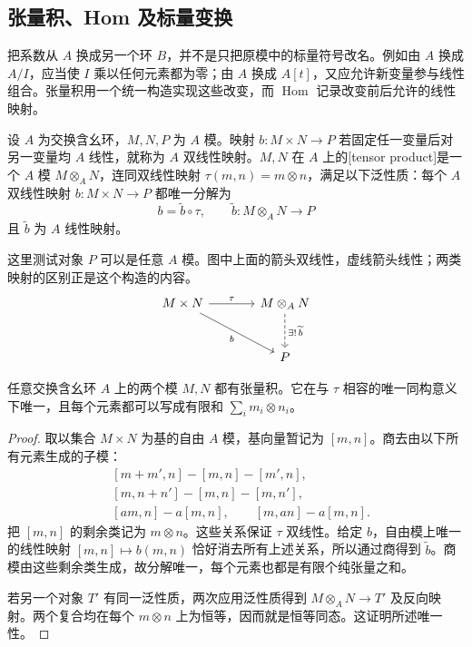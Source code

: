 \subsection{张量积、Hom 及标量变换}
\label{g5:subsec:0202:03}

把系数从 \(A\) 换成另一个环 \(B\)，并不是只把原模中的标量符号改名。例如由 \(A\) 换成 \(A/I\)，应当使 \(I\) 乘以任何元素都为零；由 \(A\) 换成 \(A[t]\)，又应允许新变量参与线性组合。张量积用一个统一构造实现这些改变，而 \(\operatorname{Hom}\) 记录改变前后允许的线性映射。

\begin{definition}\label{g5:def:tensor-product}
	设 \(A\) 为交换含幺环，\(M,N,P\) 为 \(A\) 模。映射 \(b:M\times N\rightarrow P\) 若固定任一变量后对另一变量均 \(A\) 线性，就称为 \(A\) 双线性映射。\(M,N\) 在 \(A\) 上的[tensor product]是一个 \(A\) 模 \(M\otimes_A N\)，连同双线性映射 \(\tau(m,n)=m\otimes n\)，满足以下泛性质：每个 \(A\) 双线性映射 \(b:M\times N\rightarrow P\) 都唯一分解为
	\[
		b=\widetilde b\circ\tau,\qquad
		\widetilde b:M\otimes_A N\longrightarrow P
	\]
	且 \(\widetilde b\) 为 \(A\) 线性映射。
\end{definition}

这里测试对象 \(P\) 可以是任意 \(A\) 模。图中上面的箭头双线性，虚线箭头线性；两类映射的区别正是这个构造的内容。
\[
	\begin{tikzcd}[column sep=large,row sep=large]
		M\times N\arrow[r,"\tau"]\arrow[dr,"b"']&
		M\otimes_A N\arrow[d,dashed,"\exists!\,\widetilde b"]\\
		&P
	\end{tikzcd}
\]

\begin{proposition}\label{g5:prop:tensor-construction}
	任意交换含幺环 \(A\) 上的两个模 \(M,N\) 都有张量积。它在与 \(\tau\) 相容的唯一同构意义下唯一，且每个元素都可以写成有限和 \(\sum_i m_i\otimes n_i\)。
\end{proposition}
\begin{proof}
	取以集合 \(M\times N\) 为基的自由 \(A\) 模，基向量暂记为 \([m,n]\)。商去由以下所有元素生成的子模：
	\[
	\begin{aligned}
		&[m+m',n]-[m,n]-[m',n],\\
		&[m,n+n']-[m,n]-[m,n'],\\
		&[am,n]-a[m,n],\qquad [m,an]-a[m,n].
	\end{aligned}
	\]
	把 \([m,n]\) 的剩余类记为 \(m\otimes n\)。这些关系保证 \(\tau\) 双线性。给定 \(b\)，自由模上唯一的线性映射 \([m,n]\mapsto b(m,n)\) 恰好消去所有上述关系，所以通过商得到 \(\widetilde b\)。商模由这些剩余类生成，故分解唯一，每个元素也都是有限个纯张量之和。

	若另一个对象 \(T'\) 有同一泛性质，两次应用泛性质得到 \(M\otimes_A N\rightarrow T'\) 及反向映射。两个复合均在每个 \(m\otimes n\) 上为恒等，因而就是恒等同态。这证明所述唯一性。
\end{proof}

